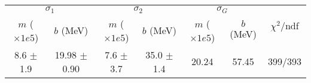 \begin{tabular}{cc|cc|cc||c}
\multicolumn{2}{c|}{$\sigma_1$} & \multicolumn{2}{|c}{$\sigma_2$} & \multicolumn{2}{|c}{$\sigma_G$}  & \multirow{2}{*}{$\chi^2/$ndf}\\
$m$ ($\times1e5$) & $b$ (MeV) & $m$ ($\times1e5$) & $b$ (MeV) & $m$ ($\times1e5$) & $b$ (MeV) & \\
\hline
8.6 $\pm$ 1.9 & 19.98 $\pm$ 0.90 & 7.6 $\pm$ 3.7 & 35.0 $\pm$ 1.4 & 20.24 & 57.45 & 399/393\\
\end{tabular}
